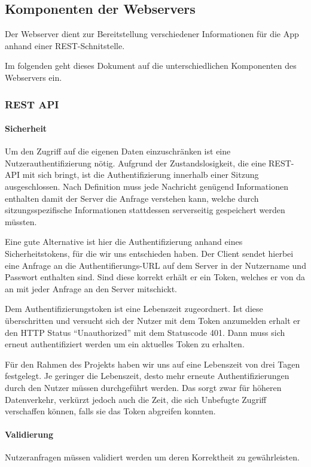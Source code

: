 \subsection{Komponenten der Webservers}
Der Webserver dient zur Bereitstellung verschiedener Informationen für die App anhand einer REST-Schnitstelle. 

Im folgenden geht dieses Dokument auf die unterschiedlichen Komponenten des Webservers ein.
\subsubsection{REST API}
\paragraph{Sicherheit}
Um den Zugriff auf die eigenen Daten einzuschränken ist eine Nutzerauthentifizierung nötig. Aufgrund der Zustandslosigkeit, die eine REST-API mit sich bringt, ist die Authentifizierung innerhalb einer Sitzung ausgeschlossen. Nach Definition muss jede Nachricht genügend Informationen enthalten damit der Server die Anfrage verstehen kann, welche durch sitzungsspezifische Informationen stattdessen serverseitig gespeichert werden müssten.

Eine gute Alternative ist hier die Authentifizierung anhand eines Sicherheitstokens, für die wir uns entschieden haben. Der Client sendet hierbei eine Anfrage an die Authentifierungs-URL auf dem Server in der Nutzername und Passwort enthalten sind. Sind diese korrekt erhält er ein Token, welches er von da an mit jeder Anfrage an den Server mitschickt.

Dem Authentifizierungstoken ist eine Lebenszeit zugeordnert. Ist diese überschritten und versucht sich der Nutzer mit dem Token anzumelden erhalt er den HTTP Status ``Unauthorized'' mit dem Statuscode 401. Dann muss sich erneut authentifiziert werden um ein aktuelles Token zu erhalten.

Für den Rahmen des Projekts haben wir uns auf eine Lebenszeit von drei Tagen festgelegt. Je geringer die Lebenszeit, desto mehr erneute Authentifizierungen durch den Nutzer müssen durchgeführt werden. Das sorgt zwar für höheren Datenverkehr, verkürzt jedoch auch die Zeit, die sich Unbefugte Zugriff verschaffen können, falls sie das Token abgreifen konnten. 
\paragraph{Validierung}
Nutzeranfragen müssen validiert werden um deren Korrektheit zu gewährleisten.

